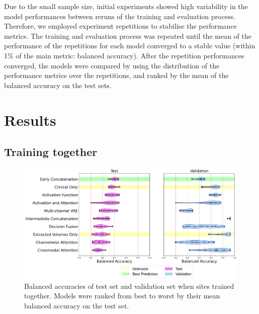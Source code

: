 Due to the small sample size, initial experiments showed high variability in the model performances between reruns of the training and evaluation process.
Therefore, we employed experiment repetitions to stabilise the performance metrics.
The training and evaluation process was repeated until the mean of the performance of the repetitions for each model converged to a stable value (within 1\% of the main metric: balanced accuracy).
After the repetition performances converged, the models were compared by using the distribution of the performance metrics over the repetitions, and ranked by the mean of the balanced accuracy on the test sets.


\section{Results}
\subsection{Training together}

\begin{figure}
    \centering
    \hspace*{-2cm}
    \includegraphics[width=1.2\linewidth]{figures/both_sites_together_balanced_accuracy_violin}
    \caption{Balanced accuracies of test set and validation set when sites trained together.
    Models were ranked from best to worst by their mean balanced accuracy on the test set.}
    \label{fig:trainedtogetherviolin}
\end{figure}

